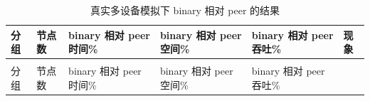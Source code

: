 \begin{longtable}[]{@{}
  >{\centering\arraybackslash}p{}
  >{\centering\arraybackslash}p{}
  >{\centering\arraybackslash}p{}
  >{\centering\arraybackslash}p{}
  >{\centering\arraybackslash}p{}
  >{\raggedright\arraybackslash}p{}@{}}
\caption{真实多设备模拟下 binary 相对 peer 的结果}\label{tbl:l1-vs-peer}\tabularnewline
\toprule\noalign{}
\begin{minipage}[t]{\hsize}\centering
分组
\end{minipage} & \begin{minipage}[t]{\hsize}\centering
节点数
\end{minipage} & \begin{minipage}[t]{\hsize}\centering
binary 相对 peer 时间\%
\end{minipage} & \begin{minipage}[t]{\hsize}\centering
binary 相对 peer 空间\%
\end{minipage} & \begin{minipage}[t]{\hsize}\centering
binary 相对 peer 吞吐\%
\end{minipage} & \begin{minipage}[t]{\hsize}\centering
现象
\end{minipage} \\
\midrule\noalign{}
\endfirsthead
\multicolumn{6}{r}{（续表\thetable）} \\
\toprule\noalign{}
\begin{minipage}[t]{\hsize}\centering
分组
\end{minipage} & \begin{minipage}[t]{\hsize}\centering
节点数
\end{minipage} & \begin{minipage}[t]{\hsize}\centering
binary 相对 peer 时间\%
\end{minipage} & \begin{minipage}[t]{\hsize}\centering
binary 相对 peer 空间\%
\end{minipage} & \begin{minipage}[t]{\hsize}\centering
binary 相对 peer 吞吐\%
\end{minipage} & \begin{minipage}[t]{\hsize}\centering

\end{minipage}
\end{longtable}
